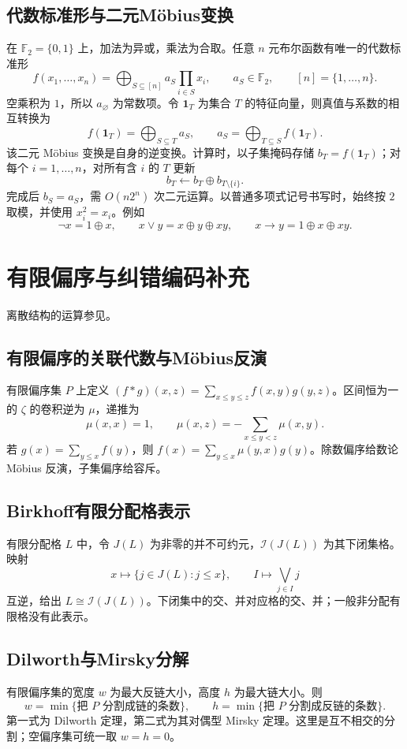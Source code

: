 \documentclass[../main.tex]{subfiles}
\begin{document}
\subsection{代数标准形与二元Möbius变换}
在 $\mathbb F_2=\{0,1\}$ 上，加法为异或，乘法为合取。任意 $n$ 元布尔函数有唯一的代数标准形
\[
f(x_1,\ldots,x_n)=\bigoplus_{S\subseteq[n]}a_S\prod_{i\in S}x_i,
\qquad a_S\in\mathbb F_2,\qquad[n]=\{1,\ldots,n\}.
\]
空乘积为 $1$，所以 $a_{\varnothing}$ 为常数项。令 $\mathbf1_T$ 为集合 $T$ 的特征向量，则真值与系数的相互转换为
\[
f(\mathbf1_T)=\bigoplus_{S\subseteq T}a_S,\qquad
a_S=\bigoplus_{T\subseteq S}f(\mathbf1_T).
\]
该二元 Möbius 变换是自身的逆变换。计算时，以子集掩码存储 $b_T=f(\mathbf1_T)$；对每个 $i=1,\ldots,n$，对所有含 $i$ 的 $T$ 更新
\[
b_T\leftarrow b_T\oplus b_{T\setminus\{i\}}.
\]
完成后 $b_S=a_S$，需 $O(n2^n)$ 次二元运算。以普通多项式记号书写时，始终按 $2$ 取模，并使用 $x_i^2=x_i$。例如
\[
\neg x=1\oplus x,\qquad
x\lor y=x\oplus y\oplus xy,\qquad
x\to y=1\oplus x\oplus xy.
\]
\section{有限偏序与纠错编码补充}
离散结构的运算参见\cite{mcs,cameron,shoup}。
\subsection{有限偏序的关联代数与Möbius反演}
有限偏序集 $P$ 上定义 $(f*g)(x,z)=\sum_{x\le y\le z}f(x,y)g(y,z)$。区间恒为一的 $\zeta$ 的卷积逆为 $\mu$，递推为
\[
\mu(x,x)=1,\qquad\mu(x,z)=-\sum_{x\le y<z}\mu(x,y).
\]
若 $g(x)=\sum_{y\le x}f(y)$，则 $f(x)=\sum_{y\le x}\mu(y,x)g(y)$。除数偏序给数论 Möbius 反演，子集偏序给容斥。
\subsection{Birkhoff有限分配格表示}
有限分配格 $L$ 中，令 $J(L)$ 为非零的并不可约元，$\mathcal I(J(L))$ 为其下闭集格。映射
\[
x\longmapsto\{j\in J(L):j\le x\},\qquad
I\longmapsto\bigvee_{j\in I}j
\]
互逆，给出 $L\cong\mathcal I(J(L))$。下闭集中的交、并对应格的交、并；一般非分配有限格没有此表示。
\subsection{Dilworth与Mirsky分解}
有限偏序集的宽度 $w$ 为最大反链大小，高度 $h$ 为最大链大小。则
\[
w=\min\{\text{把 }P\text{ 分割成链的条数}\},\qquad
h=\min\{\text{把 }P\text{ 分割成反链的条数}\}.
\]
第一式为 Dilworth 定理，第二式为其对偶型 Mirsky 定理。这里是互不相交的分割；空偏序集可统一取 $w=h=0$。
\end{document}
